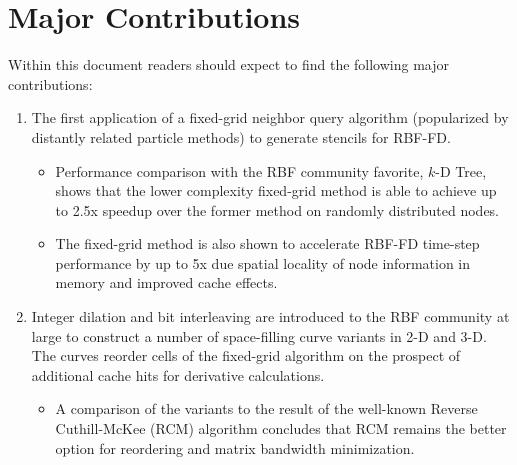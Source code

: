 \documentclass[11pt]{report}
\begin{document}



\section{Major Contributions}

Within this document readers should expect to find the following major contributions: 
\begin{enumerate} 
\item The first application of a fixed-grid neighbor query algorithm (popularized by distantly related particle methods) to generate stencils for RBF-FD. 
\begin{itemize} 
\item Performance comparison with the RBF community favorite, $k$-D Tree, shows that the lower complexity fixed-grid method is able to achieve up to 2.5x speedup over the former method on randomly distributed nodes. 
\item The fixed-grid method is also shown to accelerate RBF-FD time-step performance by up to 5x due spatial locality of node information in memory and improved cache effects.
\end{itemize} 
\item Integer dilation and bit interleaving are introduced to the RBF community at large to construct a number of space-filling curve variants in 2-D and 3-D. The curves reorder cells of the fixed-grid algorithm on the prospect of additional cache hits for derivative calculations. 
\begin{itemize} 
\item A comparison of the variants to the result of the well-known Reverse Cuthill-McKee (RCM) algorithm concludes that RCM remains the better option for reordering and matrix bandwidth minimization.


\end{itemize}
\end{enumerate}
\end{document}
